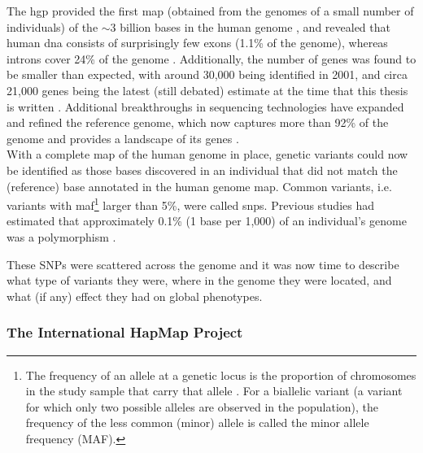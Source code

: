 The \gls{hgp} provided the first map (obtained from the genomes of a small number of individuals) of the $\sim$3 billion bases in the human genome \cite{lander2001initial, schmutz2004quality, hattori2005finishing}, and revealed that human \gls{dna} consists of surprisingly few exons (1.1\% of the genome), whereas introns cover 24\% of the genome \cite{venter2001sequence, lander2001initial}. 
Additionally, the number of genes was found to be smaller than expected, with around 30,000 being identified in 2001, and circa 21,000 genes being the latest (still debated) estimate at the time that this thesis is written \cite{pertea2018thousands}. 
Additional breakthroughs in sequencing technologies have expanded and refined the reference genome, which now captures more than 92\% of the genome and provides a landscape of its genes \cite{lander2011initial}.\\

With a complete map of the human genome in place, genetic variants could now be identified as those bases discovered in an individual that did not match the (reference) base annotated in the human genome map. 
Common variants, i.e. variants with \gls{maf}\footnote{The frequency of an
allele at a genetic locus is the proportion of chromosomes in the study sample that carry that allele \cite{laird2010fundamentals}. 
For a biallelic variant (a variant for which only two possible alleles are observed in the population), the frequency of the less common (minor) allele is called the minor allele frequency (MAF).} larger than 5\%, were called \glspl{snp}. 
Previous studies had estimated that approximately 0.1\% (1 base per 1,000) of an individual's genome was a polymorphism \cite{wang1998large, li1991low, cargill1999characterization}. 

These SNPs were scattered across the genome and it was now time to describe what type of variants they were, where in the genome they were located, and what (if any) effect they had on global phenotypes.

\subsubsection{The International HapMap Project}

